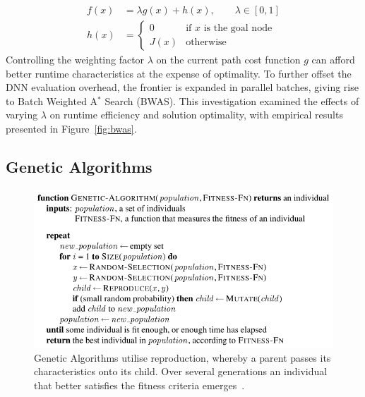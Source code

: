 \documentclass[UKenglish]{svproc}
\begin{document}
\begin{align*}
  f(x)&=\lambda g(x)+h(x),\qquad\lambda\in [0,1] \\
  h(x)&=
  \begin{cases}
    0    & \text{if $x$ is the goal node} \\
    J(x) & \text{otherwise}
  \end{cases}
\end{align*}
Controlling the weighting factor $\lambda$ on the current path cost function $g$ can afford better runtime characteristics at the expense of optimality. To further offset the DNN evaluation overhead, the frontier is expanded in parallel batches, giving rise to Batch Weighted A$^\ast$ Search (BWAS).  This investigation examined the effects of varying $\lambda$ on runtime efficiency and solution optimality, with empirical results presented in Figure~\ref{fig:bwas}.

\subsection{Genetic Algorithms}

\begin{figure}[!ht]
  \centering
  \includegraphics[width=0.9\linewidth]{genetic-algorithm}
  \caption{Genetic Algorithms utilise reproduction, whereby a parent passes its
    characteristics onto its child. Over several generations an individual that
    better satisfies the fitness criteria emerges~\cite{10.5555/1671238}.}
  \label{fig:genetic-algorithm}
\end{figure}
\end{document}
